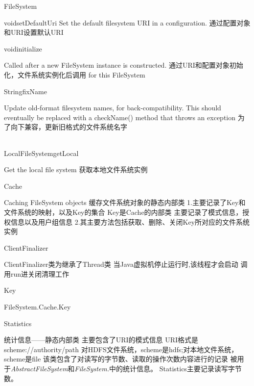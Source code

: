 \begin{XeClass}{FileSystem}
\begin{XeMethod}{\XePublic}{void}{setDefaultUri}
Set the default filesystem URI in a configuration.
通过配置对象和URI设置默认URI

    \end{XeMethod}

    \begin{XeMethod}{\XePublic}{void}{initialize}

Called after a new FileSystem instance is constructed.
通过URI和配置对象初始化，文件系统实例化后调用
for this FileSystem

    \end{XeMethod}

    \begin{XeMethod}{\XePrivate}{String}{fixName}

Update old-format filesystem names, for back-compatibility.  This should
eventually be replaced with a checkName() method that throws an exception
为了向下兼容，更新旧格式的文件系统名字

    \end{XeMethod}

    \begin{XeMethod}{\XePublic \\ \XeStatic}{LocalFileSystem}{getLocal}

Get the local file system
获取本地文件系统实例

    \end{XeMethod}


    \begin{XeInnerClass}{Cache}

Caching FileSystem objects
缓存文件系统对象的静态内部类
1.主要记录了Key和文件系统的映射，以及Key的集合
Key是Cache的内部类
主要记录了模式信息，授权信息以及用户组信息
2.其主要方法包括获取、删除、关闭Key所对应的文件系统实例

        \begin{XeInnerClass}{ClientFinalizer}

ClientFinalizer类为继承了Thread类
当Java虚拟机停止运行时,该线程才会启动
调用run进关闭清理工作

        \end{XeInnerClass}
        \begin{XeInnerClass}{Key}

FileSystem.Cache.Key

        \end{XeInnerClass}
    \end{XeInnerClass}
    \begin{XeInnerClass}{Statistics}

统计信息——静态内部类
主要包含了URI的模式信息
URI格式是scheme://authority/path
对HDFS文件系统，scheme是hdfs;对本地文件系统，scheme是file
该类包含了对读写的字节数、读取的操作次数内容进行的记录
被用于\emph{AbstractFileSystem}和\emph{FileSystem.}中的统计信息。
Statistics主要记录读写字节数。

    \end{XeInnerClass}
\end{XeClass}
